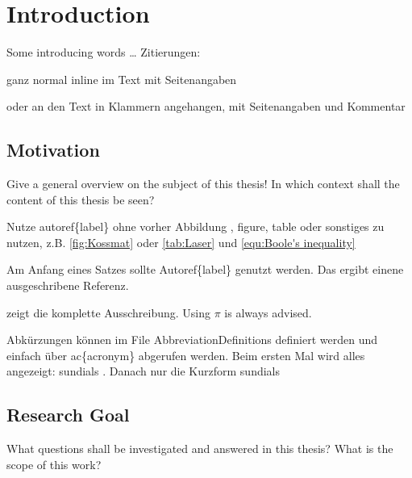 \chapter{Introduction}
\authorAnGu
Some introducing words \dots
Zitierungen:

ganz normal inline im Text mit Seitenangaben \cite[6]{franke17}

oder an den Text in Klammern angehangen, mit Seitenangaben und Kommentar \autocites(see also his earlier work)[347-348]{franke17}


\section{Motivation}
Give a general overview on the subject of this thesis! In which context shall the content of this thesis be seen? 

Nutze autoref\{label\} ohne vorher Abbildung , figure, table oder sonstiges zu nutzen, z.B. \autoref{fig:Kossmat} oder \autoref{tab:Laser} und \autoref{equ:Boole's inequality} 

Am Anfang eines Satzes sollte Autoref\{label\} genutzt werden. Das ergibt einene ausgeschribene Referenz.

 zeigt die komplette Ausschreibung. Using $\pi$ is always advised.

Abkürzungen können im File AbbreviationDefinitions definiert werden und einfach über ac\{acronym\} abgerufen werden. Beim ersten Mal wird alles angezeigt: \ac{sundials} . Danach nur die Kurzform \ac{sundials}

\section{Research Goal}
What questions shall be investigated and answered in this thesis? What is the scope of this work?
